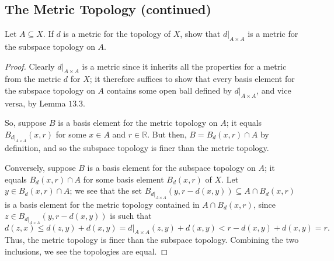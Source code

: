 \documentclass[12pt]{article}
\theoremstyle{remark}
\begin{document}
\subsection{The Metric Topology (continued)}
\begin{problem}
  Let $A \subseteq X$. If $d$ is a metric for the topology of $X$, show that $d|_{A \times A}$ is a metric for the subspace topology on $A$.
\end{problem}
\begin{proof}
  Clearly $d|_{A \times A}$ is a metric since it inherits all the properties for a metric from the metric $d$ for $X$; it therefore suffices to show that every basis element for the subspace topology on $A$ contains some open ball defined by $d|_{A \times A}$, and vice versa, by Lemma $13.3$.
  \par So, suppose $B$ is a basis element for the metric topology on $A$; it
  equals $B_{d|_{A \times A}}(x,r)$ for some $x \in A$ and $r \in \mathbb{R}$.
  But then, $B = B_d(x,r) \cap A$ by definition, and so the subspace topology is
  finer than the metric topology.
  \par Conversely, suppose $B$ is a basis element for the subspace topology on
  $A$; it equals $B_d(x,r) \cap A$ for some basis element $B_d(x,r)$ of $X$. Let
  $y \in B_d(x,r) \cap A$; we see that the set $B_{d|_{A \times A}}(y,r-d(x,y))
  \subseteq A \cap B_d(x,r)$ is a basis element for the metric topology
  contained in $A \cap B_d(x,r)$, since $z \in B_{d|_{A \times A}}(y,r-d(x,y))$
  is such that
  \begin{equation*}
    d(z,x) \le d(z,y) + d(x,y) = d|_{A \times A}(z,y) + d(x,y) < r-d(x,y)
    +d(x,y) = r.
  \end{equation*}
  Thus, the metric topology is finer than the subspace topology. Combining the
  two inclusions, we see the topologies are equal.
\end{proof}
\end{document}
